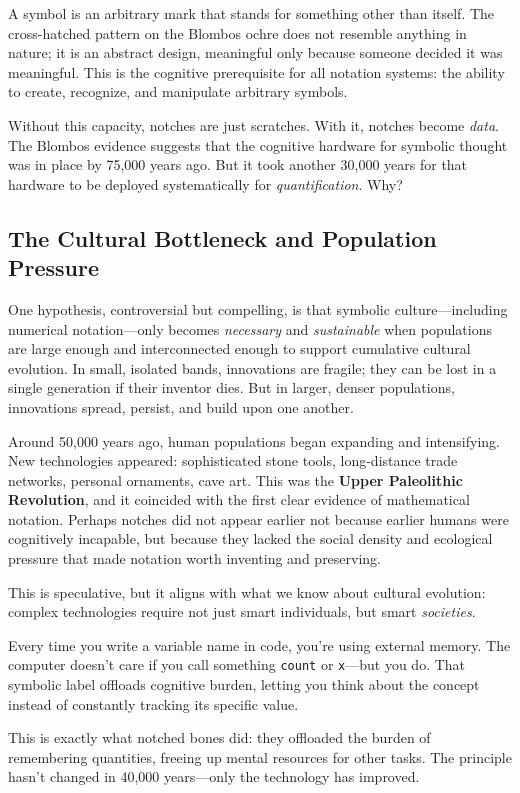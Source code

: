 A symbol is an arbitrary mark that stands for something other than itself. The cross-hatched pattern on the Blombos ochre does not resemble anything in nature; it is an abstract design, meaningful only because someone decided it was meaningful. This is the cognitive prerequisite for all notation systems: the ability to create, recognize, and manipulate arbitrary symbols.

Without this capacity, notches are just scratches. With it, notches become \textit{data}. The Blombos evidence suggests that the cognitive hardware for symbolic thought was in place by 75,000 years ago. But it took another 30,000 years for that hardware to be deployed systematically for \textit{quantification}. Why?

\subsection{The Cultural Bottleneck and Population Pressure}

One hypothesis, controversial but compelling, is that symbolic culture---including numerical notation---only becomes \textit{necessary} and \textit{sustainable} when populations are large enough and interconnected enough to support cumulative cultural evolution. In small, isolated bands, innovations are fragile; they can be lost in a single generation if their inventor dies. But in larger, denser populations, innovations spread, persist, and build upon one another.

Around 50,000 years ago, human populations began expanding and intensifying. New technologies appeared: sophisticated stone tools, long-distance trade networks, personal ornaments, cave art. This was the \textbf{Upper Paleolithic Revolution}, and it coincided with the first clear evidence of mathematical notation. Perhaps notches did not appear earlier not because earlier humans were cognitively incapable, but because they lacked the social density and ecological pressure that made notation worth inventing and preserving.

This is speculative, but it aligns with what we know about cultural evolution: complex technologies require not just smart individuals, but smart \textit{societies}.

\begin{connection}
	Every time you write a variable name in code, you're using external memory. The computer doesn't care if you call something \texttt{count} or \texttt{x}—but you do. That symbolic label offloads cognitive burden, letting you think about the concept instead of constantly tracking its specific value.
	
	This is exactly what notched bones did: they offloaded the burden of remembering quantities, freeing up mental resources for other tasks. The principle hasn't changed in 40,000 years—only the technology has improved.
\end{connection}


